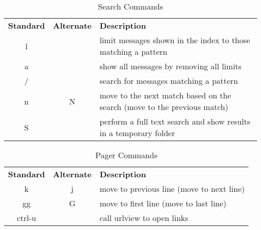 \documentclass{article}
\begin{document}
\begin{table*}[!b]
\renewcommand{\arraystretch}{1.3}
\caption{Search Commands}
\label{tab:search}
\footnotesize
\begin{tabulary}{\textwidth}{CCL}
  \textbf{Standard} & \textbf{Alternate} & \textbf{Description}\\
  l & & limit messages shown in the index to those matching a pattern\\
  a & & show all messages by removing all limits\\
  / & & search for messages matching a pattern\\
  n & N & move to the next match based on the search (move to the previous match)\\
  S & & perform a full text search and show results in a temporary folder\\
\end{tabulary}
\end{table*}


\begin{table*}[!b]
\renewcommand{\arraystretch}{1.3}
\caption{Pager Commands}
\label{tab:pager}
\footnotesize
\begin{tabulary}{\textwidth}{CCL}
  \textbf{Standard} & \textbf{Alternate} & \textbf{Description}\\
  k & j & move to previous line (move to next line)\\
  gg & G & move to first line (move to last line)\\
  ctrl-u & & call urlview to open links\\
\end{tabulary}
\end{table*}
\end{document}

